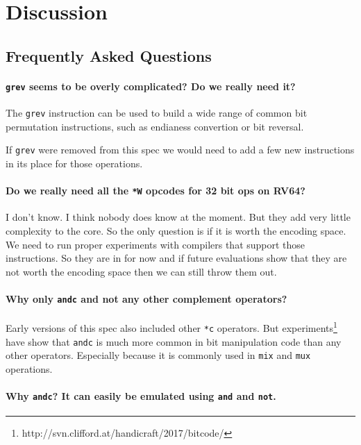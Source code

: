 \chapter{Discussion}

\section{Frequently Asked Questions}

\subsubsection{\texttt{grev} seems to be overly complicated? Do we really need it?}

The \texttt{grev} instruction can be used to build a wide range of common
bit permutation instructions, such as endianess convertion or bit reversal.

If \texttt{grev} were removed from this spec we would need to add a few
new instructions in its place for those operations.

\subsubsection{Do we really need all the \texttt{*W} opcodes for 32 bit ops on RV64?}

I don't know. I think nobody does know at the moment. But they add very little
complexity to the core. So the only question is if it is worth the encoding
space. We need to run proper experiments with compilers that support those
instructions. So they are in for now and if future evaluations show that they
are not worth the encoding space then we can still throw them out.

\subsubsection{Why only \texttt{andc} and not any other complement operators?}

Early versions of this spec also included other \texttt{*c} operators. But
experiments\footnote{http://svn.clifford.at/handicraft/2017/bitcode/} have show that
\texttt{andc} is much more common in bit manipulation code than any other operators.
Especially because it is commonly used in \texttt{mix} and \texttt{mux} operations.

\subsubsection{Why \texttt{andc}? It can easily be emulated using \texttt{and} and \texttt{not}.}

